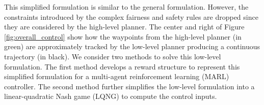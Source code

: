 This simplified formulation is similar to the general formulation. However, the constraints introduced by the complex fairness and safety rules are dropped since they are considered by the high-level planner. The center and right of Figure \ref{fig:overall_control} show how the waypoints from the high-level planner (in green) are approximately tracked by the low-level planner producing a continuous trajectory (in black). We consider two methods to solve this low-level formulation. The first method develops a reward structure to represent this simplified formulation for a multi-agent reinforcement learning (MARL) controller. The second method further simplifies the low-level formulation into a linear-quadratic Nash game (LQNG) to compute the control inputs. 

